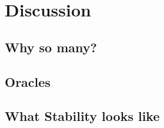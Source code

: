 %
%
%
%
%

\section{Discussion}

\subsection{Why so many?}


\subsection{Oracles}

\subsection{What Stability looks like}\label{sec:stability}

